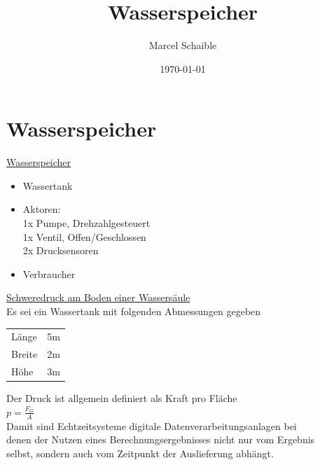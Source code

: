 \documentclass[11pt]{article}
\author{Marcel Schaible}
\date{\today}
\title{Wasserspeicher}
\begin{document}
\maketitle
\tableofcontents


\section{Wasserspeicher}
\label{sec:org89e9aa8}



\href{./wasserSpeicher.pdf}{Wasserspeicher}\\

\begin{itemize}
\item Wassertank\\
\item Aktoren:\\
1x Pumpe, Drehzahlgesteuert\\
1x Ventil, Offen/Geschlossen\\
2x Drucksensoren\\
\item Verbraucher\\
\end{itemize}

\href{https://www.leifiphysik.de/mechanik/druck-und-auftrieb/grundwissen/schweredruck}{Schweredruck am Boden einer Wassersäule}\\

Es sei ein Wassertank mit folgenden Abmessungen gegeben\\

\begin{center}
\begin{tabular}{ll}
Länge & 5m\\
Breite & 2m\\
Höhe & 3m\\
\end{tabular}
\end{center}

Der Druck ist allgemein definiert als Kraft pro Fläche\\
\(p =\frac{F_G}{A}\)\\



Damit sind Echtzeitsysteme digitale Datenverarbeitungsanlagen bei\\
denen der Nutzen eines Berechnungsergebnisses nicht nur vom Ergebnis\\
selbst, sondern auch vom Zeitpunkt der Auslieferung abhängt.\\
\end{document}
